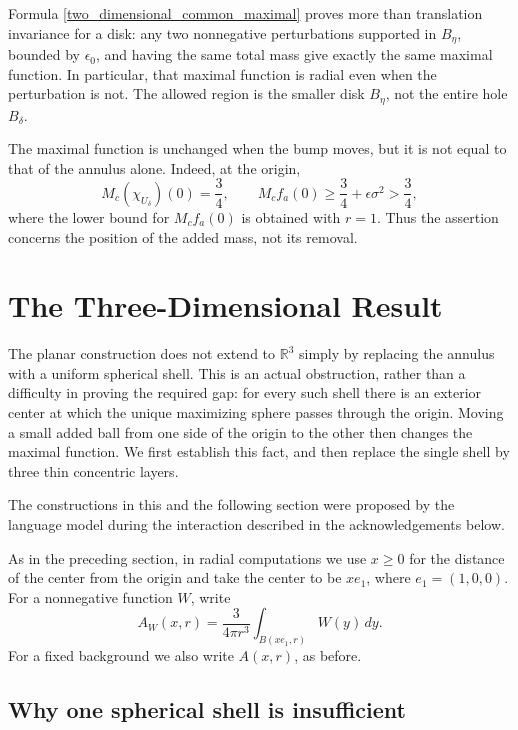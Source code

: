 \documentclass[12pt]{amsart}
\numberwithin{equation}{section}
\begin{document}
\begin{remark}
Formula \eqref{two_dimensional_common_maximal} proves more than
translation invariance for a disk: any two nonnegative perturbations
supported in $B_\eta$, bounded by $\epsilon_0$, and having the same
total mass give exactly the same maximal function. In particular,
that maximal function is radial even when the perturbation is not.
The allowed region is the smaller disk $B_\eta$, not the entire hole
$B_\delta$.
\end{remark}

\begin{remark}
The maximal function is unchanged when the bump moves, but it is not
equal to that of the annulus alone. Indeed, at the origin,
\[
M_c(\chi_{U_\delta})(0)=\frac34,
\qquad M_cf_a(0)\geq\frac34+\epsilon\sigma^2>\frac34,
\]
where the lower bound for $M_cf_a(0)$ is obtained with $r=1$.
Thus the assertion concerns the position of the added mass, not its removal.
\end{remark}


\section{The Three-Dimensional Result}
\label{three_dimensional_result}

The planar construction does not extend to $\mathbb{R}^3$ simply by
replacing the annulus with a uniform spherical shell. This is an actual
obstruction, rather than a difficulty in proving the required gap:
for every such shell there is an exterior center at which the unique
maximizing sphere passes through the origin. Moving a small added ball
from one side of the origin to the other then changes the maximal
function. We first establish this fact, and then replace the single
shell by three thin concentric layers.

The constructions in this and the following section were proposed by
the language model during the interaction described in the
acknowledgements below.

As in the preceding section, in radial computations we use $x\geq0$
for the distance of the center from the origin and take the center to
be $xe_1$, where $e_1=(1,0,0)$. For a nonnegative function $W$, write
\[
A_W(x,r)=\frac{3}{4\pi r^3}\int_{B(xe_1,r)}W(y)\,dy.
\]
For a fixed background we also write $A(x,r)$, as before.

\subsection{Why one spherical shell is insufficient}
\end{document}
